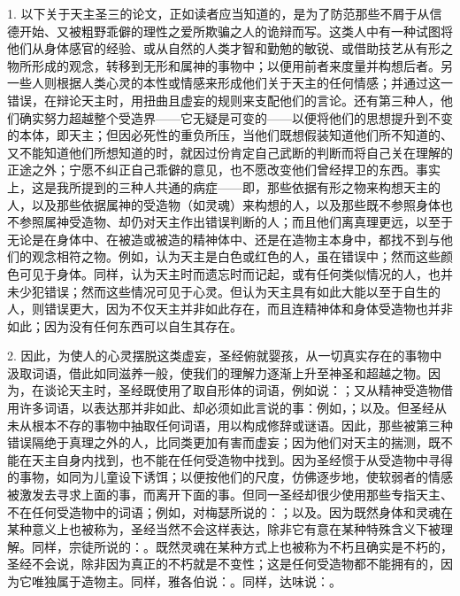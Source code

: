 1. 以下关于天主圣三的论文，正如读者应当知道的，是为了防范那些不屑于从信德开始、又被粗野乖僻的理性之爱所欺骗之人的诡辩而写。这类人中有一种试图将他们从身体感官的经验、或从自然的人类才智和勤勉的敏锐、或借助技艺从有形之物所形成的观念，转移到无形和属神的事物中；以便用前者来度量并构想后者。另一些人则根据人类心灵的本性或情感来形成他们关于天主的任何情感；并通过这一错误，在辩论天主时，用扭曲且虚妄的规则来支配他们的言论。还有第三种人，他们确实努力超越整个受造界——它无疑是可变的——以便将他们的思想提升到不变的本体，即天主；但因必死性的重负所压，当他们既想假装知道他们所不知道的、又不能知道他们所想知道的时，就因过份肯定自己武断的判断而将自己关在理解的正途之外；宁愿不纠正自己乖僻的意见，也不愿改变他们曾经捍卫的东西。事实上，这是我所提到的三种人共通的病症——即，那些依据有形之物来构想天主的人，以及那些依据属神的受造物（如灵魂）来构想的人，以及那些既不参照身体也不参照属神受造物、却仍对天主作出错误判断的人；而且他们离真理更远，以至于无论是在身体中、在被造或被造的精神体中、还是在造物主本身中，都找不到与他们的观念相符之物。例如，认为天主是白色或红色的人，虽在错误中；然而这些颜色可见于身体。同样，认为天主时而遗忘时而记起，或有任何类似情况的人，也并未少犯错误；然而这些情况可见于心灵。但认为天主具有如此大能以至于自生的人，则错误更大，因为不仅天主并非如此存在，而且连精神体和身体受造物也并非如此；因为没有任何东西可以自生其存在。\par

2. 因此，为使人的心灵摆脱这类虚妄，圣经俯就婴孩，从一切真实存在的事物中汲取词语，借此如同滋养一般，使我们的理解力逐渐上升至神圣和超越之物。因为，在谈论天主时，圣经既使用了取自形体的词语，例如说：；又从精神受造物借用许多词语，以表达那并非如此、却必须如此言说的事：例如，；以及。但圣经从未从根本不存的事物中抽取任何词语，用以构成修辞或谜语。因此，那些被第三种错误隔绝于真理之外的人，比同类更加有害而虚妄；因为他们对天主的揣测，既不能在天主自身内找到，也不能在任何受造物中找到。因为圣经惯于从受造物中寻得的事物，如同为儿童设下诱饵；以便按他们的尺度，仿佛逐步地，使软弱者的情感被激发去寻求上面的事，而离开下面的事。但同一圣经却很少使用那些专指天主、不在任何受造物中的词语；例如，对梅瑟所说的：；以及。因为既然身体和灵魂在某种意义上也被称为，圣经当然不会这样表达，除非它有意在某种特殊含义下被理解。同样，宗徒所说的：。既然灵魂在某种方式上也被称为不朽且确实是不朽的，圣经不会说，除非因为真正的不朽就是不变性；这是任何受造物都不能拥有的，因为它唯独属于造物主。同样，雅各伯说：。同样，达味说：。\par

